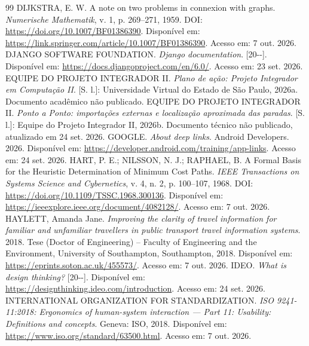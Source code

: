 \documentclass[12pt,oneside,a4paper,brazil,chapter=TITLE]{abntex2}
\begin{document}
\begin{thebibliography}{99}
 DIJKSTRA, E. W. A note on two problems in connexion with graphs. \textit{Numerische Mathematik}, v. 1, p. 269--271, 1959. DOI: \url{https://doi.org/10.1007/BF01386390}. Disponível em: \url{https://link.springer.com/article/10.1007/BF01386390}. Acesso em: 7 out. 2026.
 DJANGO SOFTWARE FOUNDATION. \textit{Django documentation}. [20\mbox{-}\mbox{-}]. Disponível em: \url{https://docs.djangoproject.com/en/6.0/}. Acesso em: 23 set. 2026.
 EQUIPE DO PROJETO INTEGRADOR II. \textit{Plano de ação: Projeto Integrador em Computação II}. [S. l.]: Universidade Virtual do Estado de São Paulo, 2026a. Documento acadêmico não publicado.
 EQUIPE DO PROJETO INTEGRADOR II. \textit{Ponto a Ponto: importações externas e localização aproximada das paradas}. [S. l.]: Equipe do Projeto Integrador II, 2026b. Documento técnico não publicado, atualizado em 24 set. 2026.
 GOOGLE. \textit{About deep links}. Android Developers. 2026. Disponível em: \url{https://developer.android.com/training/app-links}. Acesso em: 24 set. 2026.
 HART, P. E.; NILSSON, N. J.; RAPHAEL, B. A Formal Basis for the Heuristic Determination of Minimum Cost Paths. \textit{IEEE Transactions on Systems Science and Cybernetics}, v. 4, n. 2, p. 100--107, 1968. DOI: \url{https://doi.org/10.1109/TSSC.1968.300136}. Disponível em: \url{https://ieeexplore.ieee.org/document/4082128/}. Acesso em: 7 out. 2026.
 HAYLETT, Amanda Jane. \textit{Improving the clarity of travel information for familiar and unfamiliar travellers in public transport travel information systems}. 2018. Tese (Doctor of Engineering) -- Faculty of Engineering and the Environment, University of Southampton, Southampton, 2018. Disponível em: \url{https://eprints.soton.ac.uk/455573/}. Acesso em: 7 out. 2026.
 IDEO. \textit{What is design thinking?} [20\mbox{-}\mbox{-}]. Disponível em: \url{https://designthinking.ideo.com/introduction}. Acesso em: 24 set. 2026.
 INTERNATIONAL ORGANIZATION FOR STANDARDIZATION. \textit{ISO 9241-11:2018: Ergonomics of human-system interaction --- Part 11: Usability: Definitions and concepts}. Geneva: ISO, 2018. Disponível em: \url{https://www.iso.org/standard/63500.html}. Acesso em: 7 out. 2026.

\end{thebibliography}
\end{document}
